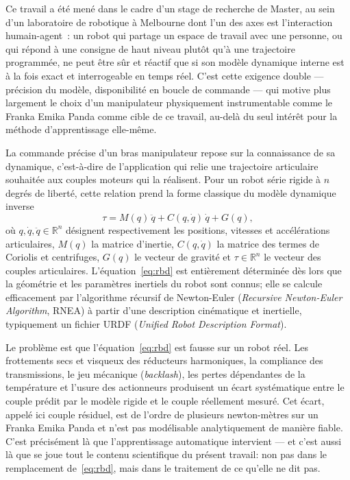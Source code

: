 \documentclass[a4paper, oneside]{article}
\newcommand{\q}{\ensuremath{q}}
\newcommand{\qd}{\ensuremath{\dot{q}}}
\newcommand{\qdd}{\ensuremath{\ddot{q}}}
\newcommand{\Rset}{\ensuremath{\mathbb{R}}}
\begin{document}
Ce travail a été mené dans le cadre d'un stage de recherche de Master, au sein
d'un laboratoire de robotique à Melbourne dont l'un des axes est l'interaction
humain-agent~: un robot qui partage un espace de travail avec une personne, ou
qui répond à une consigne de haut niveau plutôt qu'à une trajectoire
programmée, ne peut être sûr et réactif que si son modèle dynamique interne
est à la fois exact et interrogeable en temps réel. C'est cette exigence
double — précision du modèle, disponibilité en boucle de commande — qui motive
plus largement le choix d'un manipulateur physiquement instrumentable comme le
Franka Emika Panda comme cible de ce travail, au-delà du seul intérêt pour la
méthode d'apprentissage elle-même.

La commande précise d'un bras manipulateur repose sur la connaissance de sa
dynamique, c'est-à-dire de l'application qui relie une trajectoire articulaire
souhaitée aux couples moteurs qui la réalisent. Pour un robot série rigide à
$n$ degrés de liberté, cette relation prend la forme classique du modèle
dynamique inverse
%
\begin{equation}
    \tau = M(\q)\,\qdd + C(\q,\qd)\,\qd + G(\q) ,
    \label{eq:rbd}
\end{equation}
%
où $\q, \qd, \qdd \in \Rset^{n}$ désignent respectivement les positions,
vitesses et accélérations articulaires, $M(\q)$ la matrice d'inertie,
$C(\q,\qd)$ la matrice des termes de Coriolis et centrifuges, $G(\q)$ le
vecteur de gravité et $\tau \in \Rset^{n}$ le vecteur des couples
articulaires. L'équation~\eqref{eq:rbd} est entièrement déterminée dès lors que
la géométrie et les paramètres inertiels du robot sont connus; elle se calcule
efficacement par l'algorithme récursif de Newton-Euler (\emph{Recursive
Newton-Euler Algorithm}, RNEA) à partir d'une description cinématique et
inertielle, typiquement un fichier URDF (\emph{Unified Robot Description
Format}).

Le problème est que l'équation~\eqref{eq:rbd} est fausse sur un robot réel. Les
frottements secs et visqueux des réducteurs harmoniques, la compliance des
transmissions, le jeu mécanique (\emph{backlash}), les pertes dépendantes de la
température et l'usure des actionneurs produisent un écart systématique entre
le couple prédit par le modèle rigide et le couple réellement mesuré. Cet
écart, appelé ici couple résiduel, est de l'ordre de plusieurs newton-mètres
sur un Franka Emika Panda et n'est pas modélisable analytiquement de manière
fiable. C'est précisément là que l'apprentissage automatique intervient — et
c'est aussi là que se joue tout le contenu scientifique du présent travail:
non pas dans le remplacement de~\eqref{eq:rbd}, mais dans le traitement de ce
qu'elle ne dit pas.
\end{document}
